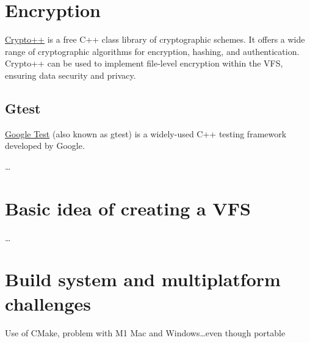 \section{Encryption}\label{sec:encryption-analysis}

\href{https://www.cryptopp.com/}{Crypto++} is a free C++ class library of cryptographic schemes.
It offers a wide range of cryptographic algorithms for encryption, hashing, and authentication.
Crypto++ can be used to implement file-level encryption within the VFS, ensuring data security and privacy.

\subsection{Gtest}\label{subsec:gtest}

\href{https://github.com/google/googletest}{Google Test} (also known as gtest) is a widely-used C++ testing framework developed by Google.

\ldots

\section{Basic idea of creating a VFS}\label{sec:basic-idea-of-creating-a-vfs}

\ldots

\section{Build system and multiplatform challenges}\label{sec:build-system-and-multiplatform-challenges}

Use of CMake, problem with M1 Mac and Windows\ldots even though portable